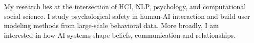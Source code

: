 \vspace{3mm}
My research lies at the intersection of HCI, NLP, psychology, and computational social science. I study psychological safety in human-AI interaction and build user modeling methods from large-scale behavioral data. More broadly, I am interested in how AI systems shape beliefs, communication and relationships.
\vspace{3mm}
